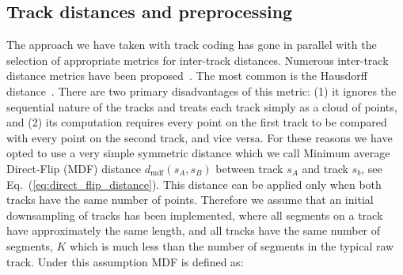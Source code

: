 \documentclass[preprint,authoryear,a4paper,10pt,onecolumn]{elsarticle}
\begin{document}








\subsection{\label{sub:track-distances}Track distances and preprocessing}

The approach we have taken with track coding has gone in parallel with
the selection of appropriate metrics for inter-track distances.
Numerous inter-track distance metrics have been proposed~\citep{Ding2003, MaddahIPMI2007, zhang2005dti}. The most common is the
Hausdorff distance~\citep[and many other
studies]{corouge2004towards}. There are two primary disadvantages of
this metric: (1) it ignores the sequential nature of the tracks and
treats each track simply as a cloud of points, and (2) its computation
requires every point on the first track to be compared with every point
on the second track, and vice versa. For these reasons we have opted to
use a very simple symmetric distance \citep{EGMB10, Visser2010} which we
call Minimum average Direct-Flip (MDF) distance
$d_{\textrm{mdf}}(s_{A},s_{B})$ between track $s_{A}$ and track $s_{b}$,
see Eq.~(\ref{eq:direct_flip_distance}). This distance can be applied
only when both tracks have the same number of points. Therefore we
assume that an initial downsampling of tracks has been implemented,
where all segments on a track have approximately the same length, and
all tracks have the same number of segments, $K$ which is much less than
the number of segments in the typical raw track. Under this assumption MDF is
defined as:
\end{document}
